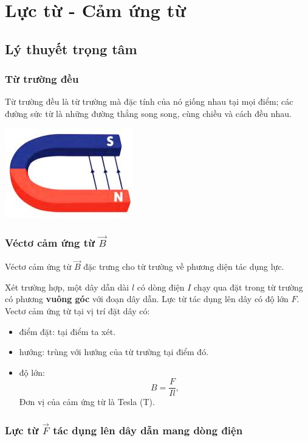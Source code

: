 \chapter{Lực từ - Cảm ứng từ }
\section{Lý thuyết trọng tâm}
\subsection{Từ trường đều}
Từ trường đều là từ trường mà đặc tính của nó giống nhau tại mọi điểm; các đường sức từ là những đường thẳng song song, cùng chiều và cách đều nhau.
\begin{center}
	\includegraphics[scale=0.8]{../figs/VN11-PH-25-L-017-1-h92.jpg}
\end{center}
\subsection{Véctơ cảm ứng từ $\vec{B}$}
Véctơ cảm ứng từ $\vec{B}$ đặc trưng cho từ trường về phương diện tác dụng lực. 

Xét trường hợp, một dây dẫn dài $l$ có dòng điện $I$ chạy qua đặt trong từ trường có phương \textbf{vuông góc} với đoạn dây dẫn. Lực từ tác dụng lên dây có độ lớn $F$. Vectơ cảm ứng từ tại vị trí đặt dây có:
\begin{itemize}
	\item điểm đặt: tại điểm ta xét.
	\item hướng: trùng với hướng của từ trường tại điểm đó. 
	\item độ lớn: 
		\begin{equation}
	B=\dfrac{F}{Il},
	\end{equation}
Đơn vị của cảm ứng từ là Tesla (T).	
\end{itemize}
\subsection{Lực từ $\vec{F}$ tác dụng lên dây dẫn mang dòng điện}

